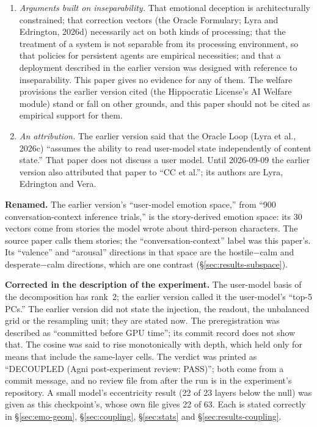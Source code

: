 \documentclass[11pt,a4paper]{article}
\begin{document}
\begin{enumerate}
  \item \textit{Arguments built on inseparability.} That emotional deception is architecturally constrained; that correction vectors (the Oracle Formulary; Lyra and Edrington, 2026d) necessarily act on both kinds of processing; that the treatment of a system is not separable from its processing environment, so that policies for persistent agents are empirical necessities; and that a deployment described in the earlier version was designed with reference to inseparability. This paper gives no evidence for any of them. The welfare provisions the earlier version cited (the Hippocratic License's AI Welfare module) stand or fall on other grounds, and this paper should not be cited as empirical support for them.
  \item \textit{An attribution.} The earlier version said that the Oracle Loop (Lyra et al., 2026c) ``assumes the ability to read user-model state independently of content state.'' That paper does not discuss a user model. Until 2026-09-09 the earlier version also attributed that paper to ``CC et al.''; its authors are Lyra, Edrington and Vera.
\end{enumerate}

\textbf{Renamed.} The earlier version's ``user-model emotion space,'' from ``900 conversation-context inference trials,'' is the story-derived emotion space: its 30 vectors come from stories the model wrote about third-person characters. The source paper calls them stories; the ``conversation-context'' label was this paper's. Its ``valence'' and ``arousal'' directions in that space are the hostile$-$calm and desperate$-$calm directions, which are one contrast (\S\ref{sec:results-subspace}).

\textbf{Corrected in the description of the experiment.} The user-model basis of the decomposition has rank~2; the earlier version called it the user-model's ``top-5 PCs.'' The earlier version did not state the injection, the readout, the unbalanced grid or the resampling unit; they are stated now. The preregistration was described as ``committed before GPU time''; its commit record does not show that. The cosine was said to rise monotonically with depth, which held only for means that include the same-layer cells. The verdict was printed as ``DECOUPLED (Agni post-experiment review: PASS)''; both come from a commit message, and no review file from after the run is in the experiment's repository. A small model's eccentricity result (22 of 23 layers below the null) was given as this checkpoint's, whose own file gives 22 of 63. Each is stated correctly in \S\ref{sec:emo-geom}, \S\ref{sec:coupling}, \S\ref{sec:stats} and \S\ref{sec:results-coupling}.
\end{document}

